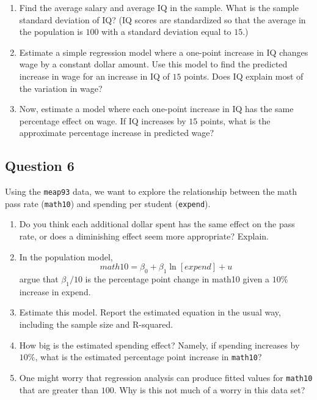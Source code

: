 \documentclass[]{article}
\providecommand{\tightlist}{%
  \setlength{\itemsep}{0pt}\setlength{\parskip}{0pt}}
\begin{document}
\begin{enumerate}
\def\labelenumi{\arabic{enumi}.}
\tightlist
\item
  Find the average salary and average IQ in the sample. What is the
  sample standard deviation of IQ? (IQ scores are standardized so that
  the average in the population is \(100\) with a standard deviation
  equal to \(15\).)
\item
  Estimate a simple regression model where a one-point increase in IQ
  changes wage by a constant dollar amount. Use this model to find the
  predicted increase in wage for an increase in IQ of \(15\) points.
  Does IQ explain most of the variation in wage?
\item
  Now, estimate a model where each one-point increase in IQ has the same
  percentage effect on wage. If IQ increases by \(15\) points, what is
  the approximate percentage increase in predicted wage?
\end{enumerate}

\subsection{Question 6}\label{question-6}

Using the \texttt{meap93} data, we want to explore the relationship
between the math pass rate (\texttt{math10}) and spending per student
(\texttt{expend}).

\begin{enumerate}
\def\labelenumi{\arabic{enumi}.}
\tightlist
\item
  Do you think each additional dollar spent has the same effect on the
  pass rate, or does a diminishing effect seem more appropriate?
  Explain.
\item
  In the population model, \[math10 = \beta_0+\beta_1 \ln[expend] + u\]
  argue that \(\beta_1/10\) is the percentage point change in math10
  given a \(10\%\) increase in expend.
\item
  Estimate this model. Report the estimated equation in the usual way,
  including the sample size and R-squared.
\item
  How big is the estimated spending effect? Namely, if spending
  increases by \(10\%\), what is the estimated percentage point increase
  in \texttt{math10}?
\item
  One might worry that regression analysis can produce fitted values for
  \texttt{math10} that are greater than \(100\). Why is this not much of
  a worry in this data set?
\end{enumerate}
\end{document}

